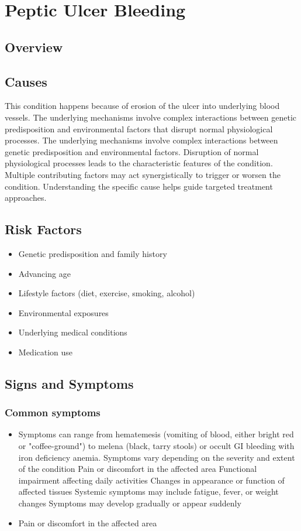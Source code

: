 \chapter{Peptic Ulcer Bleeding}
\label{sec:Peptic Ulcer Bleeding}

\section{Overview}

\section{Causes}
This condition happens because of erosion of the ulcer into underlying blood vessels. The underlying mechanisms involve complex interactions between genetic predisposition and environmental factors that disrupt normal physiological processes. The underlying mechanisms involve complex interactions between genetic predisposition and environmental factors. Disruption of normal physiological processes leads to the characteristic features of the condition. Multiple contributing factors may act synergistically to trigger or worsen the condition. Understanding the specific cause helps guide targeted treatment approaches.
\section{Risk Factors}


\begin{itemize}[noitemsep]
  \item Genetic predisposition and family history
  \item Advancing age
  \item Lifestyle factors (diet, exercise, smoking, alcohol)
  \item Environmental exposures
  \item Underlying medical conditions
  \item Medication use
\end{itemize}
\section{Signs and Symptoms}

\subsection{Common symptoms}
\begin{itemize}[noitemsep]
  \item Symptoms can range from hematemesis (vomiting of blood, either bright red or "coffee-ground") to melena (black, tarry stools) or occult GI bleeding with iron deficiency anemia. Symptoms vary depending on the severity and extent of the condition Pain or discomfort in the affected area Functional impairment affecting daily activities Changes in appearance or function of affected tissues Systemic symptoms may include fatigue, fever, or weight changes Symptoms may develop gradually or appear suddenly
  \item Pain or discomfort in the affected area
  \end{itemize}


